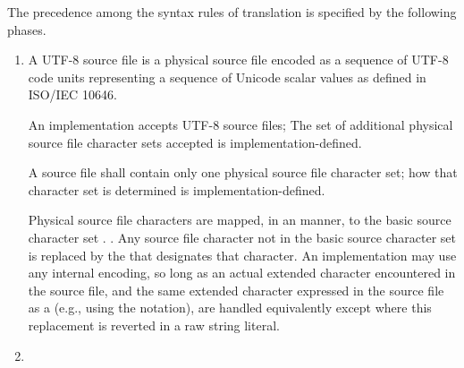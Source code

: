 \documentclass{wg21}
\begin{document}
\pnum
{}%
The precedence among the syntax rules of translation is specified by the
following phases.

\begin{enumerate}
    \item

\begin{addedblock}
    A UTF-8 source file is a physical source file encoded as a sequence of UTF-8 code units representing a sequence of Unicode scalar values as defined in ISO/IEC 10646.

    An implementation accepts UTF-8 source files; The set of additional physical source file character sets accepted is implementation-defined.

    A source file shall contain only one physical source file character set; how that character set is determined is implementation-defined.
\end{addedblock}

Physical source file characters are mapped, in an
 manner,
to the basic source character set .
.
Any source file character not in the basic source character set is replaced by the  that
designates that character.
An implementation may use any internal
encoding, so long as an actual extended character encountered in the
source file, and the same extended character expressed in the source
file as a  (e.g., using the  notation), are handled equivalently except where this replacement is reverted in a raw string literal.

\item
{}%


\end{enumerate}
\end{document}
